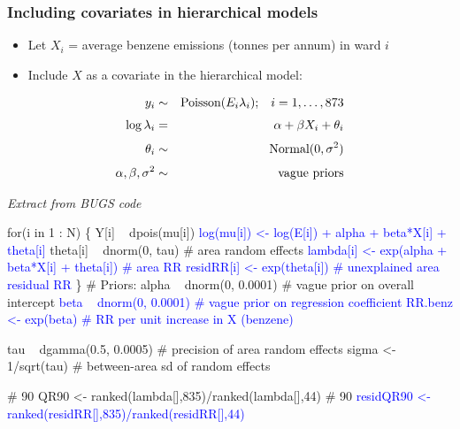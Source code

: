 \documentclass{beamer}
\newcommand{\bi}{\begin{itemize}}
\newcommand{\ei}{\end{itemize}}
\newcommand{\I}{\item}
\begin{document}
\begin{frame}
\frametitle{Including covariates in hierarchical models}
\bi
\I Let $X_i$ = average benzene emissions (tonnes per annum) in ward $i$\vspace{2mm}
\I Include $X$ as a covariate in the hierarchical model:
\ei\vspace{-2mm}
\begin{eqnarray*}
y_i & \sim & \hbox{Poisson}(E_i \lambda_i); \;\;\; i=1,\ldots,873 \\[3pt]
\log \lambda_i & = & \alpha + \beta X_i + \theta_i\\[3pt]
\theta_i  &\sim&  \hbox{Normal}(0, \sigma^2)\\[3pt]
\alpha, \beta, \sigma^2 & \sim & \hbox{vague priors}
\end{eqnarray*}
\end{frame}

\begin{frame}[fragile]
{\it Extract from BUGS code}
\begin{footnotesize}
\begin{ColorVerbatim}
 for(i in 1 : N) \{
  Y[i] ~ dpois(mu[i])
\textcolor{blue}{  log(mu[i]) <- log(E[i]) + alpha + beta*X[i] + theta[i]}
  theta[i] ~ dnorm(0, tau) # area random effects
\textcolor{blue}{  lambda[i] <- exp(alpha + beta*X[i] + theta[i]) # area RR}
\textcolor{blue}{  residRR[i] <- exp(theta[i]) # unexplained area residual RR}
 \}
 # Priors:
 alpha  ~ dnorm(0, 0.0001) # vague prior on overall intercept
\textcolor{blue}{ beta ~ dnorm(0, 0.0001) # vague prior on regression coefficient}
\textcolor{blue}{ RR.benz <- exp(beta) # RR per unit increase in X (benzene)}

 tau ~ dgamma(0.5, 0.0005) # precision of area random effects
 sigma <- 1/sqrt(tau) # between-area sd of random effects

 # 90%
 QR90 <- ranked(lambda[],835)/ranked(lambda[],44)
 # 90%
\textcolor{blue}{ residQR90 <- ranked(residRR[],835)/ranked(residRR[],44)}
\end{ColorVerbatim}
\end{footnotesize}
\end{frame}
\end{document}
